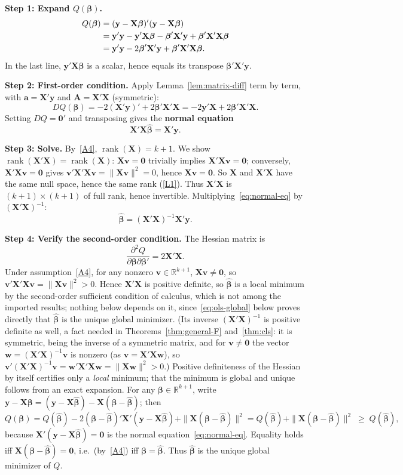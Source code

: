 \documentclass[12pt,a4paper]{article}
\makeatletter
\theoremstyle{definition}
\renewenvironment{proof}[1][\proofname]{\par
  \pushQED{\qed}%
  \normalfont \topsep6\p@\@plus6\p@\relax
  \trivlist
  \item[\hskip\labelsep\bfseries #1\@addpunct{.}]\ignorespaces
}{%
  \popQED\endtrivlist\@endpefalse
}
\DeclareMathOperator\rank{rank}
\newcommand{\bX}{\mathbf{X}}
\newcommand{\by}{\mathbf{y}}
\def\bb{\boldsymbol{\beta}}
\newcommand{\bzero}{\mathbf{0}}
\newcommand{\bw}{\mathbf{w}}
\newcommand{\bA}{\mathbf{A}}
\newcommand{\ba}{\mathbf{a}}
\newcommand{\bv}{\mathbf{v}}
\newcommand{\Real}{\mathbb{R}}
\makeatother
\begin{document}
\begin{proof}
\textbf{Step 1: Expand $Q(\bb)$.}
\begin{align}
Q(\bb) &= (\by - \bX\bb)'(\by - \bX\bb) \notag\\
&= \by'\by - \by'\bX\bb - \bb'\bX'\by + \bb'\bX'\bX\bb \notag\\
&= \by'\by - 2\bb'\bX'\by + \bb'\bX'\bX\bb.
\end{align}
In the last line, $\by'\bX\bb$ is a scalar, hence equals its transpose $\bb'\bX'\by$.

\textbf{Step 2: First-order condition.} Apply Lemma~\ref{lem:matrix-diff} term by term, with $\ba = \bX'\by$ and $\bA = \bX'\bX$ (symmetric):
\[
DQ(\bb) = -2(\bX'\by)' + 2\bb'\bX'\bX = -2\by'\bX + 2\bb'\bX'\bX.
\]
Setting $DQ = \bzero'$ and transposing gives the \textbf{normal equation}
\begin{equation}\label{eq:normal-eq}
\bX'\bX\hat{\bb} = \bX'\by.
\end{equation}

\textbf{Step 3: Solve.} By~\ref{A4}, $\rank(\bX) = k+1$. We show $\rank(\bX'\bX) = \rank(\bX)$: $\bX\bv = \bzero$ trivially implies $\bX'\bX\bv = \bzero$; conversely, $\bX'\bX\bv = \bzero$ gives $\bv'\bX'\bX\bv = \|\bX\bv\|^2 = 0$, hence $\bX\bv = \bzero$. So $\bX$ and $\bX'\bX$ have the same null space, hence the same rank (\ref{L1}). Thus $\bX'\bX$ is $(k+1) \times (k+1)$ of full rank, hence invertible. Multiplying~\eqref{eq:normal-eq} by $(\bX'\bX)^{-1}$:
\[
\hat{\bb} = (\bX'\bX)^{-1}\bX'\by.
\]

\textbf{Step 4: Verify the second-order condition.} The Hessian matrix is
\[
\frac{\partial^2 Q}{\partial \bb \partial \bb'} = 2\bX'\bX.
\]
Under assumption~\ref{A4}, for any nonzero $\bv \in \Real^{k+1}$, $\bX\bv \neq \bzero$, so $\bv'\bX'\bX\bv = \|\bX\bv\|^2 > 0$. Hence $\bX'\bX$ is positive definite, so $\hat{\bb}$ is a local minimum by the second-order sufficient condition of calculus, which is not among the imported results; nothing below depends on it, since~\eqref{eq:ols-global} below proves directly that $\hat{\bb}$ is the unique global minimizer. (Its inverse $(\bX'\bX)^{-1}$ is positive definite as well, a fact needed in Theorems~\ref{thm:general-F} and~\ref{thm:cls}: it is symmetric, being the inverse of a symmetric matrix, and for $\bv \neq \bzero$ the vector $\bw = (\bX'\bX)^{-1}\bv$ is nonzero (as $\bv = \bX'\bX\bw$), so $\bv'(\bX'\bX)^{-1}\bv = \bw'\bX'\bX\bw = \|\bX\bw\|^2 > 0$.) Positive definiteness of the Hessian by itself certifies only a \emph{local} minimum; that the minimum is global and unique follows from an exact expansion. For any $\bb \in \Real^{k+1}$, write $\by - \bX\bb = (\by - \bX\hat{\bb}) - \bX(\bb - \hat{\bb})$; then
\begin{equation}\label{eq:ols-global}
Q(\bb) = Q(\hat{\bb}) - 2(\bb - \hat{\bb})'\bX'(\by - \bX\hat{\bb}) + \|\bX(\bb - \hat{\bb})\|^2 = Q(\hat{\bb}) + \|\bX(\bb - \hat{\bb})\|^2 \;\geqslant\; Q(\hat{\bb}),
\end{equation}
because $\bX'(\by - \bX\hat{\bb}) = \bzero$ is the normal equation~\eqref{eq:normal-eq}. Equality holds iff $\bX(\bb - \hat{\bb}) = \bzero$, i.e.\ (by~\ref{A4}) iff $\bb = \hat{\bb}$. Thus $\hat{\bb}$ is the unique global minimizer of $Q$.
\end{proof}
\end{document}
